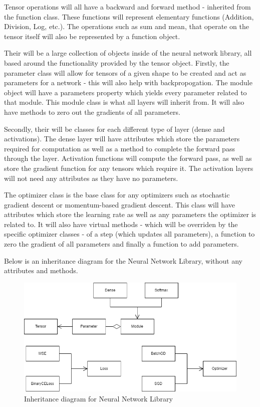 \documentclass{article}
\makeatletter
\newcommand\subsubsubsection{\@startsection{paragraph}{4}{\z@}{-2.5ex\@plus -1ex \@minus -.25ex}{1.25ex \@plus .25ex}{\normalfont\normalsize\bfseries}}
\makeatother
\begin{document}
    Tensor operations will all have a backward and forward method - inherited from the function class. These functions will represent elementary functions (Addition, Division, Log, etc.). 
    The operations such as sum and mean, that operate on the tensor itself will also be represented by a function object.

    \subsubsubsection{Neural Network Library}
    Their will be a large collection of objects inside of the neural network library, all based around the functionality provided by the tensor object.
    Firstly, the parameter class will allow for tensors of a given shape to be created and act as parameters for a network - this will also help with backpropogation.
    The module object will have a parameters property which yields every parameter related to that module. This module class is what all layers will inherit from. It will also
    have methods to zero out the gradients of all parameters.

    Secondly, their will be classes for each different type of layer (dense and activations). The dense layer will have attributes which store the parameters required
    for computation as well as a method to complete the forward pass through the layer. Activation functions will compute the forward pass, as well as store the gradient function
    for any tensors which require it. The activation layers will not need any attributes as they have no parameters.

    The optimizer class is the base class for any optimizers such as stochastic gradient descent or momentum-based gradient descent. This class will have attributes which store
    the learning rate as well as any parameters the optimizer is related to. It will also have virtual methods - which will be overriden by the specific optimizer classes - of
    a step (which updates all parameters), a function to zero the gradient of all parameters and finally a function to add parameters.

    \pagebreak
    \vspace*{7mm}
    Below is an inheritance diagram for the Neural Network Library, without any attributes and methods.

    \begin{figure}[h]
        \centering
        \includegraphics[scale=0.5]{NNUML (simple).drawio.png}
        \caption{Inheritance diagram for Neural Network Library}
    \end{figure}
\end{document}
